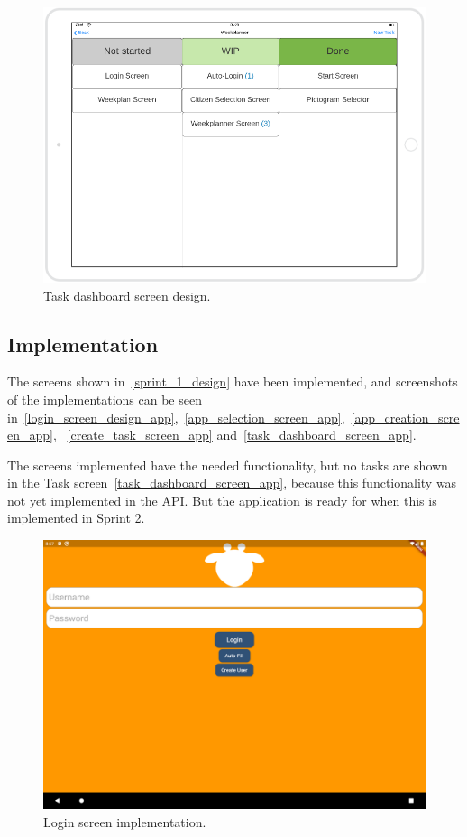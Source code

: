 \begin{figure}[H]
    \includegraphics[width=\textwidth]{Sprint_1/images/task_dashboard_screen.png}
    \caption{Task dashboard screen design.}
    \label{task_dashboard_screen}
\end{figure}

\subsection{Implementation}
The screens shown in~\autoref{sprint_1_design} have been implemented, and screenshots of the implementations can be seen in~\autoref{login_screen_design_app},~\autoref{app_selection_screen_app},~\autoref{app_creation_screen_app}, ~\autoref{create_task_screen_app} and~\autoref{task_dashboard_screen_app}.

The screens implemented have the needed functionality, but no tasks are shown in the Task screen~\autoref{task_dashboard_screen_app}, because this functionality was not yet implemented in the API.
But the application is ready for when this is implemented in Sprint 2. 


\begin{figure}[H]
    \includegraphics[width=\textwidth]{Sprint_1/images/login_screen_app.png}
    \caption{Login screen implementation.}
    \label{login_screen_design_app}
\end{figure}

